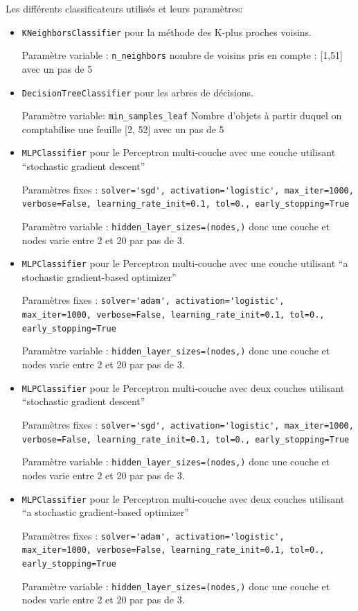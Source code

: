 \documentclass[a4paper,10pt]{article}
\begin{document}
    Les différents classificateurs utilisés et leurs paramètres:
    \begin{itemize}
        \item \verb?KNeighborsClassifier? pour la méthode des K-plus proches voisins.
        
        Paramètre variable : \verb?n_neighbors? nombre de voisins pris en compte : [1,51] avec un pas de 5
        \item \verb?DecisionTreeClassifier? pour les arbres de décisions. 
        
        Paramètre variable: \verb?min_samples_leaf? Nombre d'objets à partir duquel on comptabilise une feuille [2, 52] avec un pas de 5
        \item \verb?MLPClassifier? pour le Perceptron multi-couche avec une couche utilisant ``stochastic gradient descent''
        
        Paramètres fixes : \verb?solver='sgd', activation='logistic', max_iter=1000, verbose=False, learning_rate_init=0.1, tol=0., early_stopping=True?
        
        Paramètre variable : \verb?hidden_layer_sizes=(nodes,)? donc une couche et nodes varie entre 2 et 20 par pas de 3.
        \item \verb?MLPClassifier? pour le Perceptron multi-couche avec une couche utilisant ``a stochastic gradient-based optimizer''
        
        Paramètres fixes : \verb?solver='adam', activation='logistic', max_iter=1000, verbose=False, learning_rate_init=0.1, tol=0., early_stopping=True?
        
        Paramètre variable : \verb?hidden_layer_sizes=(nodes,)? donc une couche et nodes varie entre 2 et 20 par pas de 3.
        \item \verb?MLPClassifier? pour le Perceptron multi-couche avec deux couches utilisant ``stochastic gradient descent''
        
        Paramètres fixes : \verb?solver='sgd', activation='logistic', max_iter=1000, verbose=False, learning_rate_init=0.1, tol=0., early_stopping=True?
        
        Paramètre variable : \verb?hidden_layer_sizes=(nodes,)? donc une couche et nodes varie entre 2 et 20 par pas de 3.
        \item \verb?MLPClassifier? pour le Perceptron multi-couche avec deux couches utilisant ``a stochastic gradient-based optimizer''
        
        Paramètres fixes : \verb?solver='adam', activation='logistic', max_iter=1000, verbose=False, learning_rate_init=0.1, tol=0., early_stopping=True?
        
        Paramètre variable : \verb?hidden_layer_sizes=(nodes,)? donc une couche et nodes varie entre 2 et 20 par pas de 3.  
    \end{itemize}
    
\end{document}
